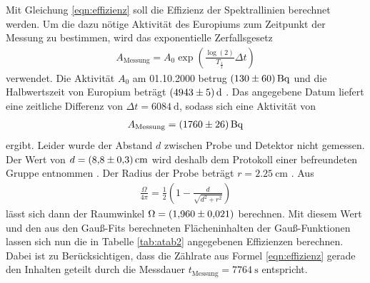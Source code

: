 Mit Gleichung \eqref{eqn:effizienz} soll die Effizienz der Spektrallinien berechnet werden.
Um die dazu nötige Aktivität des Europiums zum Zeitpunkt der Messung zu bestimmen, wird das exponentielle Zerfallsgesetz
\begin{align}
A_\text{Messung}=A_0\exp\left(\frac{\log(2)}{T_{\frac{1}{2}}}\Delta t\right)
\end{align}
verwendet.
Die Aktivität $A_0$ am 01.10.2000 betrug $\SI{130+-60}{\becquerel}$ und die Halbwertszeit von Europium beträgt $\SI{4943+-5}{\day}$ \cite{sample}.
Das angegebene Datum liefert eine zeitliche Differenz von $\Delta t=\SI{6084}{\day}$, sodass sich eine Aktivität von
\begin{align*}
A_\text{Messung}=\SI{1760+-26}{\becquerel}
\end{align*}
ergibt.
Leider wurde der Abstand $d$ zwischen Probe und Detektor nicht gemessen.
Der Wert von $d=\SI{8.8+-0.3}{\centi\meter}$ wird deshalb dem Protokoll einer befreundeten Gruppe entnommen \cite{abstand}.
Der Radius der Probe beträgt $r=\SI{2.25}{\centi\meter}$ \cite{sample}.
Aus
\begin{align}
\frac{\Omega}{4\pi}=\frac{1}{2}\left( 1- \frac{d}{\sqrt{d^2+r^2}}\right)
\end{align}
lässt sich dann der Raumwinkel $\Omega=\SI{1.96+-0.021}{}$ berechnen.
Mit diesem Wert und den aus den Gauß-Fits berechneten Flächeninhalten der Gauß-Funktionen lassen sich nun die in Tabelle \ref{tab:atab2} angegebenen Effizienzen berechnen.
Dabei ist zu Berücksichtigen, dass die Zählrate aus Formel \ref{eqn:effizienz} gerade den Inhalten geteilt durch die Messdauer $t_\text{Messung}=\SI{7764}{\second}$ entspricht.
